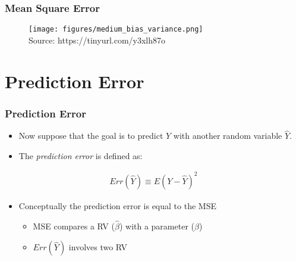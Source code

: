 \documentclass[
  shownotes,
  xcolor={svgnames},
  hyperref={colorlinks,citecolor=DarkBlue,linkcolor=DarkRed,urlcolor=DarkBlue}
  ]{beamer}
\begin{document}
\begin{frame}
\frametitle{Mean Square Error}


\begin{figure}[H] \centering
  \centering
  \texttt{[image: figures/medium\_bias\_variance.png]}
  \\
  \tiny
  Source: https://tinyurl.com/y3xlh87o
\end{figure}


\end{frame}

\section{Prediction Error}

\begin{frame}
\frametitle{Prediction Error}

\begin{itemize}
  \item Now suppose that the goal is to predict $Y$ with another random variable $\hat Y$.
  \bigskip
  \item The \emph{prediction error} is defined as:
\end{itemize}
  \bigskip

  \begin{align}
    Err(\hat Y) \equiv E\left(Y-\hat Y\right)^2\
  \end{align}

\begin{itemize}
  \item Conceptually the prediction error is equal to the MSE
  \bigskip
  \begin{itemize}
  \item MSE compares a RV ($\hat \beta$) with a parameter ($\beta$)
  \bigskip
  \item  $Err(\hat Y)$  involves two RV 
  \end{itemize}
\end{itemize}



\end{frame}

\end{document}
